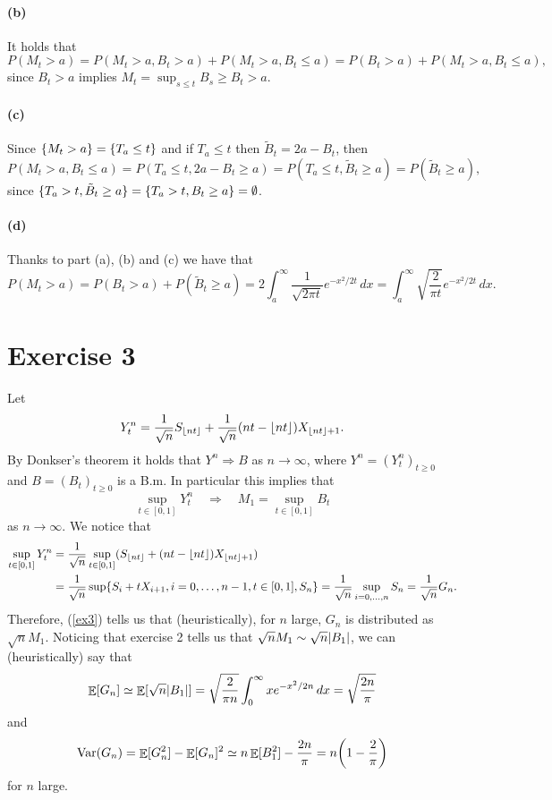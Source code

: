 \documentclass[a4paper,11pt]{article}
\theoremstyle{definition}
\theoremstyle{plain}
\theoremstyle{remark}
\DeclarePairedDelimiter{\abs}{\lvert}{\rvert}
\DeclarePairedDelimiter{\parr}{(}{)}
\DeclarePairedDelimiter{\parq}{[}{]}
\DeclarePairedDelimiter{\bra}{\lbrace}{\rbrace}
\DeclarePairedDelimiter{\floor}{\lfloor}{\rfloor}
\DeclareMathOperator*{\expval}{\mathbb{E}}
\DeclareMathOperator*{\varval}{\mathrm{Var}}
\begin{document}
\paragraph*{(b)}

It holds that
$$
P(M_t>a) = P(M_t>a,B_t>a) + P(M_t>a,B_t\leq a) = P(B_t>a) + P(M_t>a,B_t\leq a),
$$
since $B_t>a$ implies $M_t = \sup_{s\leq t}B_s\geq B_t>a$.

\paragraph*{(c)}

Since $\bra{M_t > a} = \bra{T_a\leq t}$ and if $T_a\leq t$ then $\tilde{B}_t = 2a - B_t$, then
$$
P(M_t > a, B_t \leq a) = P(T_a\leq t, 2a - B_t \geq a) = P(T_a\leq t, \tilde{B}_t \geq a) = P(\tilde{B}_t \geq a),
$$ 
since $\bra{T_a> t, \tilde{B}_t \geq a} = \bra{T_a> t, B_t \geq a} = \emptyset$.

\paragraph*{(d)}

Thanks to part (a), (b) and (c) we have that
$$
P(M_t>a) =  P(B_t>a) + P(\tilde{B}_t \geq a) = 2\int_a^\infty\frac{1}{\sqrt{2\pi t}}e^{-x^2/2t}\,dx = \int_a^\infty\sqrt{\frac{2}{\pi t}}e^{-x^2/2t}\,dx.
$$

\section*{Exercise 3}

Let
$$
Y^n_t = \frac{1}{\sqrt{n}}S_{\floor{nt}} + \frac{1}{\sqrt{n}}(nt - \floor{nt})X_{\floor{nt}+1}.
$$
By Donkser's theorem it holds that $Y^n\Rightarrow B$ as $n\to\infty$, where $Y^n = (Y^n_t)_{t\geq0}$ and $B = (B_t)_{t\geq0}$ is a B.m. In particular this implies that
\begin{equation}\label{ex3}
\sup_{t\in [0,1]} Y^n_t \quad\Rightarrow\quad M_1 = \sup_{t\in[0,1]} B_t
\end{equation}
as $n\to\infty$. We notice that
\begin{align*}
\sup_{t\in [0,1]} Y^n_t & = \frac{1}{\sqrt{n}}\sup_{t\in[0,1]}(S_{\floor{nt}} + (nt - \floor{nt})X_{\floor{nt}+1}) \\ & = \frac{1}{\sqrt{n}}\sup\bra{S_i + tX_{i+1}, i=0,\dots,n-1, t\in[0,1], S_n} = \frac{1}{\sqrt{n}}\sup_{i=0,\dots,n}S_n = \frac{1}{\sqrt{n}}G_n.
\end{align*}
Therefore, (\ref{ex3}) tells us that (heuristically), for $n$ large, $G_n$ is distributed as $\sqrt{n}M_1$. Noticing that exercise 2 tells us that $\sqrt{n}M_1 \sim \sqrt{n}\abs{B_1}$, we can (heuristically) say that
$$
\expval\parq{G_n} \simeq \expval\parq{\sqrt{n}\abs{B_1}} = \sqrt{\frac{2}{\pi n}}\int_0^\infty xe^{-x^2/2n}\,dx =\sqrt{\frac{2n}{\pi}}
$$
and
$$
\varval(G_n) = \expval\parq{G_n^2} - \expval\parq{G_n}^2 \simeq n\expval\parq{B_1^2} - \frac{2n}{\pi} =  n\parr*{1-\frac{2}{\pi}}
$$
for $n$ large.
\end{document}
